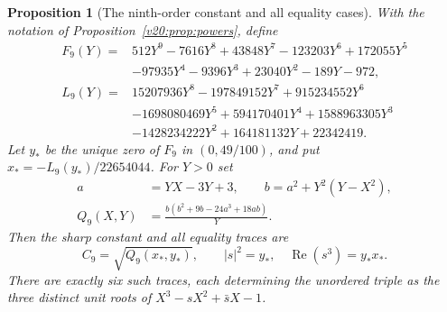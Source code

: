 \documentclass[UTF8,11pt]{ctexart}
\newtheorem{prop}[thm]{Proposition}
\theoremstyle{definition}
\numberwithin{equation}{section}
\DeclareMathOperator{\Rea}{Re}\DeclareMathOperator{\Ima}{Im}
\begin{document}
\begin{prop}[The ninth-order constant and all equality cases]
\label{v27:prop:ninthpower}
With the notation of Proposition~\ref{v20:prop:powers}, define
\begin{align*}
 F_9(Y)={}&512Y^9-7616Y^8+43848Y^7-123203Y^6
                +172055Y^5\\
         &-97935Y^4-9396Y^3+23040Y^2-189Y-972,\\
 L_9(Y)={}&15207936Y^8-197849152Y^7+915234552Y^6\\
         &-1698080469Y^5+594170401Y^4+1588963305Y^3\\
         &-1428234222Y^2+164181132Y+22342419.
\end{align*}
Let $y_*$ be the unique zero of $F_9$ in $(0,49/100)$, and put
$x_*=-L_9(y_*)/22654044$. For $Y>0$ set
\begin{equation}\label{v27:eq:objective}
 \begin{split}
 a&=YX-3Y+3,\qquad b=a^2+Y^2(Y-X^2),\\
 Q_9(X,Y)&=\frac{b(b^2+9b-24a^3+18ab)}{Y}.
 \end{split}
\end{equation}
Then the sharp constant and all equality traces are
\begin{equation}\label{v27:eq:constant}
 C_9=\sqrt{Q_9(x_*,y_*)},\qquad
 |s|^2=y_*,\quad \Rea(s^3)=y_*x_*.
\end{equation}
There are exactly six such traces, each determining the unordered
triple as the three distinct unit roots of
$X^3-sX^2+\bar sX-1$.
\end{prop}
\end{document}
